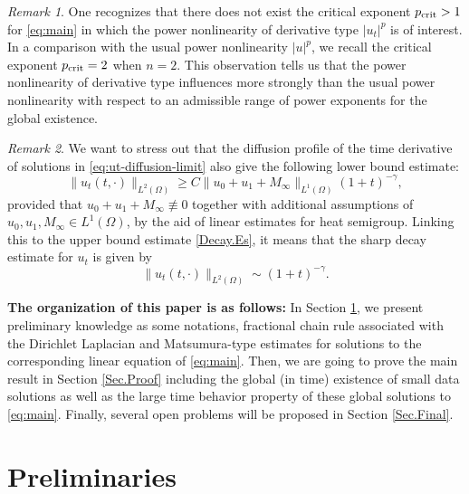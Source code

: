 \documentclass[a4paper,11pt]{article} %
\theoremstyle{remark}
\newtheorem{remark}{Remark}[section]
\theoremstyle{definition}
\numberwithin{equation}{section}
\begin{document}
\begin{remark}
One recognizes that there does not exist the critical exponent $p_{\rm crit}>1$ for \eqref{eq:main} in which the power nonlinearity of derivative type $|u_t|^p$ is of interest. In a comparison with the usual power nonlinearity $|u|^p$, we recall the critical exponent $p_{\rm crit}=2$ when $n=2$. This observation tells us that the power nonlinearity of derivative type influences more strongly than the usual power nonlinearity with respect to an admissible range of power exponents for the global existence.
\end{remark}

\begin{remark}
    We want to stress out that the diffusion profile of the time derivative of solutions in \eqref{eq:ut-diffusion-limit} also give the following lower bound estimate:
    $$ \|u_t(t,\cdot)\|_{L^2(\Omega)} \ge C\|u_0+u_1+M_\infty\|_{L^1(\Omega)}(1+t)^{-\gamma}, $$
    provided that $u_0+u_1+M_\infty \not\equiv 0$ together with additional assumptions of $u_0,u_1,M_\infty\in L^1(\Omega)$, by the aid of linear estimates for heat semigroup. Linking this to the upper bound estimate \eqref{Decay.Es}, it means that the sharp decay estimate for $u_t$ is given by
    $$ \|u_t(t,\cdot)\|_{L^2(\Omega)} \sim (1+t)^{-\gamma}. $$
\end{remark}

\noindent\textbf{The organization of this paper is as follows:} In Section \ref{Pre.Sec}, we present preliminary knowledge as some notations, fractional chain rule associated with the Dirichlet Laplacian and Matsumura-type estimates for solutions to the corresponding linear equation of \eqref{eq:main}. Then, we are going to prove the main result in Section \ref{Sec.Proof} including the global (in time) existence of small data solutions as well as the large time behavior property of these global solutions to \eqref{eq:main}. Finally, several open problems will be proposed in Section \ref{Sec.Final}.


\section{Preliminaries}\label{Pre.Sec}
\end{document}
